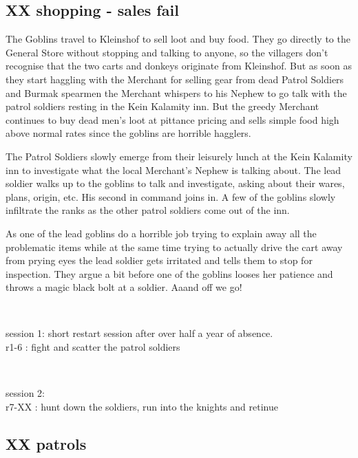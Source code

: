 \subsection*{XX shopping - sales fail}

The Goblins travel to Kleinshof to sell loot and buy food. They go directly to the General Store without stopping and talking to anyone, so the villagers don't recognise that the two carts and donkeys originate from Kleinshof. But as soon as they start haggling with the Merchant for selling gear from dead Patrol Soldiers and Burmak spearmen the Merchant whispers to his Nephew to go talk with the patrol soldiers resting in the Kein Kalamity inn. But the greedy Merchant continues to buy dead men's loot at pittance pricing and sells simple food high above normal rates since the goblins are horrible hagglers.

The Patrol Soldiers slowly emerge from their leisurely lunch at the Kein Kalamity inn to investigate what the local Merchant's Nephew is talking about. The lead soldier walks up to the goblins to talk and investigate, asking about their wares, plans, origin, etc. His second in command joins in. A few of the goblins slowly infiltrate the ranks as the other patrol soldiers come out of the inn.

As one of the lead goblins do a horrible job trying to explain away all the problematic items while at the same time trying to actually drive the cart away from prying eyes the lead soldier gets irritated and tells them to stop for inspection. They argue a bit before one of the goblins looses her patience and throws a magic black bolt at a soldier. Aaand off we go!

\

session 1: short restart session after over half a year of absence.\\
r1-6 : fight and scatter the patrol soldiers

\

session 2:\\
r7-XX : hunt down the soldiers, run into the knights and retinue







% 


\subsection*{XX patrols}




